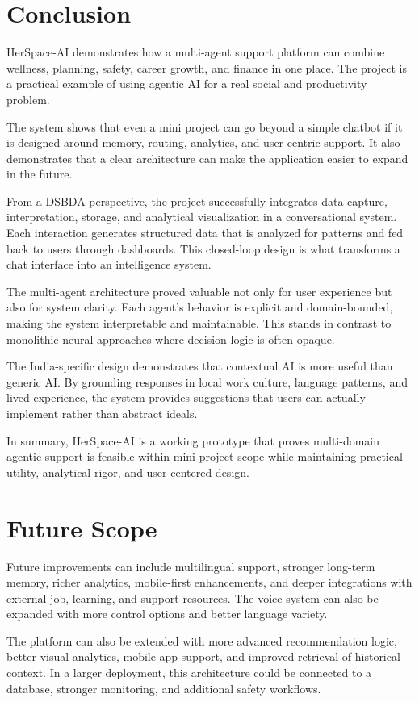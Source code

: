 \documentclass[oneside,a4paper,12pt]{report}
\begin{document}
\section{Conclusion}
HerSpace-AI demonstrates how a multi-agent support platform can combine wellness, planning, safety, career growth, and finance in one place. The project is a practical example of using agentic AI for a real social and productivity problem.

The system shows that even a mini project can go beyond a simple chatbot if it is designed around memory, routing, analytics, and user-centric support. It also demonstrates that a clear architecture can make the application easier to expand in the future.

From a DSBDA perspective, the project successfully integrates data capture, interpretation, storage, and analytical visualization in a conversational system. Each interaction generates structured data that is analyzed for patterns and fed back to users through dashboards. This closed-loop design is what transforms a chat interface into an intelligence system.

The multi-agent architecture proved valuable not only for user experience but also for system clarity. Each agent's behavior is explicit and domain-bounded, making the system interpretable and maintainable. This stands in contrast to monolithic neural approaches where decision logic is often opaque.

The India-specific design demonstrates that contextual AI is more useful than generic AI. By grounding responses in local work culture, language patterns, and lived experience, the system provides suggestions that users can actually implement rather than abstract ideals.

In summary, HerSpace-AI is a working prototype that proves multi-domain agentic support is feasible within mini-project scope while maintaining practical utility, analytical rigor, and user-centered design.

\section{Future Scope}
Future improvements can include multilingual support, stronger long-term memory, richer analytics, mobile-first enhancements, and deeper integrations with external job, learning, and support resources. The voice system can also be expanded with more control options and better language variety.

The platform can also be extended with more advanced recommendation logic, better visual analytics, mobile app support, and improved retrieval of historical context. In a larger deployment, this architecture could be connected to a database, stronger monitoring, and additional safety workflows.
\end{document}
